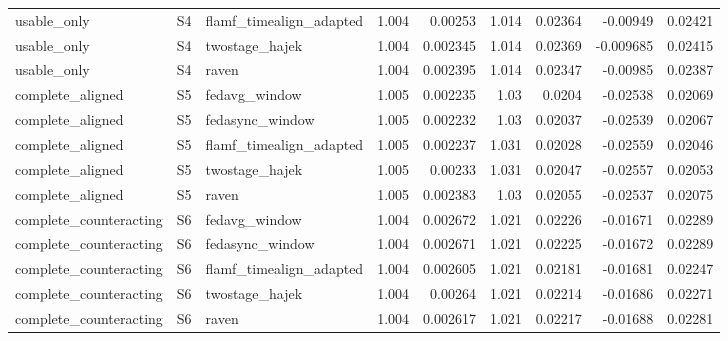 \begin{table}
\begin{tabular}{lllrrrrrr}
usable_only & S4 & flamf_timealign_adapted & 1.004 & 0.00253 & 1.014 & 0.02364 & -0.00949 & 0.02421 \\
usable_only & S4 & twostage_hajek & 1.004 & 0.002345 & 1.014 & 0.02369 & -0.009685 & 0.02415 \\
usable_only & S4 & raven & 1.004 & 0.002395 & 1.014 & 0.02347 & -0.00985 & 0.02387 \\
complete_aligned & S5 & fedavg_window & 1.005 & 0.002235 & 1.03 & 0.0204 & -0.02538 & 0.02069 \\
complete_aligned & S5 & fedasync_window & 1.005 & 0.002232 & 1.03 & 0.02037 & -0.02539 & 0.02067 \\
complete_aligned & S5 & flamf_timealign_adapted & 1.005 & 0.002237 & 1.031 & 0.02028 & -0.02559 & 0.02046 \\
complete_aligned & S5 & twostage_hajek & 1.005 & 0.00233 & 1.031 & 0.02047 & -0.02557 & 0.02053 \\
complete_aligned & S5 & raven & 1.005 & 0.002383 & 1.03 & 0.02055 & -0.02537 & 0.02075 \\
complete_counteracting & S6 & fedavg_window & 1.004 & 0.002672 & 1.021 & 0.02226 & -0.01671 & 0.02289 \\
complete_counteracting & S6 & fedasync_window & 1.004 & 0.002671 & 1.021 & 0.02225 & -0.01672 & 0.02289 \\
complete_counteracting & S6 & flamf_timealign_adapted & 1.004 & 0.002605 & 1.021 & 0.02181 & -0.01681 & 0.02247 \\
complete_counteracting & S6 & twostage_hajek & 1.004 & 0.00264 & 1.021 & 0.02214 & -0.01686 & 0.02271 \\
complete_counteracting & S6 & raven & 1.004 & 0.002617 & 1.021 & 0.02217 & -0.01688 & 0.02281 \\
\bottomrule
\end{tabular}
\end{table}
